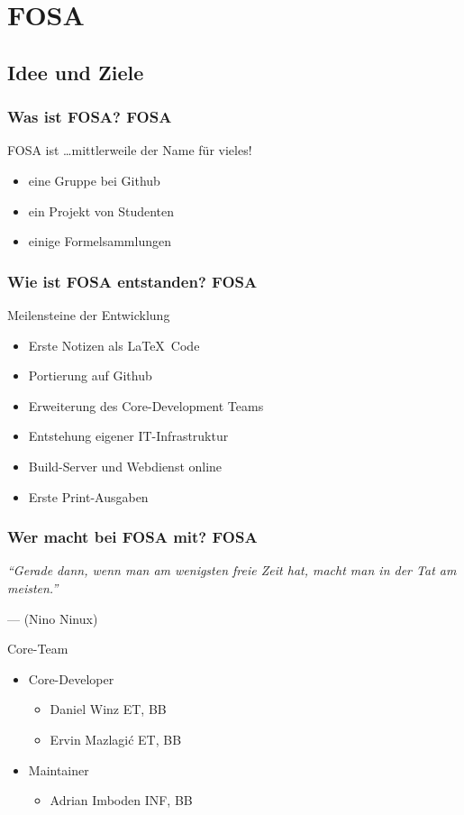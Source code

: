 \section{FOSA}

\subsection{Idee und Ziele}
\begin{frame}
	\frametitle{Was ist FOSA? \hfill{} \footnotesize{FOSA}}
	\begin{block}{FOSA ist \dots mittlerweile der Name für vieles!}
		\begin{itemize}
			\item eine Gruppe bei Github
			\item ein Projekt von Studenten
			\item einige Formelsammlungen 
		\end{itemize}
	\end{block}
\end{frame}

\begin{frame}
	\frametitle{Wie ist FOSA entstanden? \hfill{} \footnotesize{FOSA}}
	\begin{block}{Meilensteine der Entwicklung}
		\begin{itemize}
			\item Erste Notizen als \LaTeX~Code
			\item Portierung auf Github
			\item Erweiterung des Core-Development Teams
			\item Entstehung eigener IT-Infrastruktur
			\item Build-Server und Webdienst online
			\item Erste Print-Ausgaben
		\end{itemize}
	\end{block}
\end{frame}

\begin{frame}
	\frametitle{Wer macht bei FOSA mit? \hfill{} \footnotesize{FOSA}}
	\textit{"`Gerade dann, wenn man am wenigsten freie Zeit hat, 
	macht man in der Tat am meisten."'}

	\hfill{} --- (Nino Ninux)
	\vfill{}
	\begin{block}{Core-Team}
		\begin{itemize}
			\item Core-Developer
				\begin{itemize}
					\item Daniel Winz 
						\hfill{} \footnotesize
						ET, BB \normalsize
					\item Ervin Mazlagi\'c
						\hfill{} \footnotesize
						ET, BB \normalsize
				\end{itemize}
			\item Maintainer
				\begin{itemize}
					\item Adrian Imboden
						\hfill{} \footnotesize
						INF, BB \normalsize
				\end{itemize}
		\end{itemize}
	\end{block}
\end{frame}

